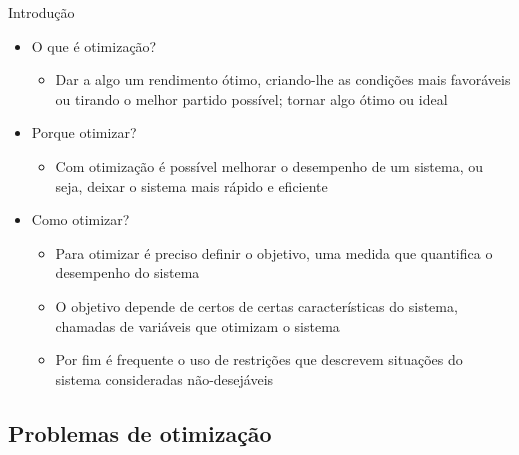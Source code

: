 \begin{frame}{Introdução~\cite{Nocedal2006}}
  \begin{itemize}\addtolength{\itemsep}{\baselineskip}
    \item O que é otimização?
    \begin{itemize}
      \item Dar a algo um rendimento ótimo, criando-lhe as condições mais favoráveis ou tirando o melhor partido possível; tornar algo ótimo ou ideal \cite{HolandaFerreira2010}
    \end{itemize}
  
    \item Porque otimizar?
    \begin{itemize}
      \item Com otimização é possível melhorar o desempenho de um sistema, ou seja, deixar o sistema mais rápido e eficiente \cite{Nocedal2006}
    \end{itemize}
    
    \item Como otimizar?
    \begin{itemize}
      \item Para otimizar é preciso definir o \alert{objetivo}, uma medida que quantifica o desempenho do sistema
      \item O objetivo depende de certos de certas características do sistema, chamadas de \alert{variáveis} que otimizam o sistema
      \item Por fim é frequente o uso de \alert{restrições} que descrevem situações do sistema consideradas não-desejáveis \cite{Nocedal2006}
    \end{itemize}
  \end{itemize}
\end{frame}

\subsection{Problemas de otimização}

